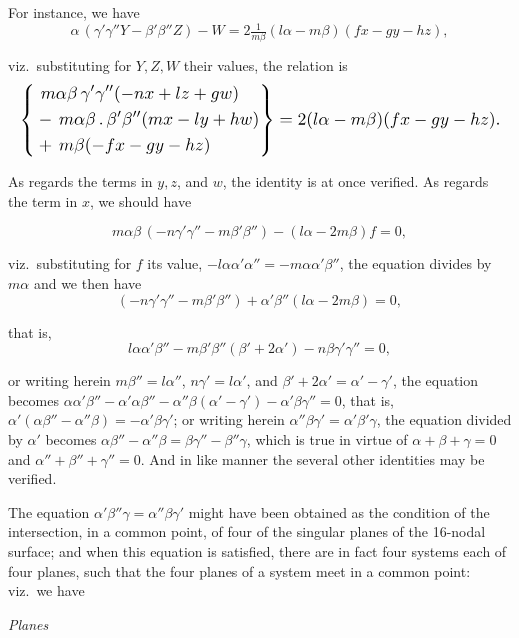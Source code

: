 \documentclass[11pt]{article}
\begin{document}
For instance, we have
\[
\alpha\,(\gamma'\gamma'' Y - \beta'\beta'' Z) - W = 2\tfrac{1}{m\beta}(l\alpha - m\beta)(fx - gy - hz),
\]

viz.\ substituting for $Y, Z, W$ their values, the relation is
\[
\resizebox{\textwidth}{!}{$\displaystyle
\left\{
\begin{aligned}
&\ m\alpha\beta\,\gamma'\gamma''(-nx + lz + gw) \\
&-\,m\alpha\beta\,.\,\beta'\beta''(mx - ly + hw) \\
&+\,m\beta(-fx - gy - hz)
\end{aligned}
\right\} = 2(l\alpha - m\beta)(fx - gy - hz).
$}
\]

As regards the terms in $y, z$, and $w$, the identity is at once verified. As regards the term in $x$, we should have

\[
m\alpha\beta\,(-n\gamma'\gamma'' - m\beta'\beta'') - (l\alpha - 2m\beta)f = 0,
\]

viz.\ substituting for $f$ its value, $-l\alpha\alpha'\alpha'' = -m\alpha\alpha'\beta''$, the equation divides by $m\alpha$ and we then have
\[
(-n\gamma'\gamma'' - m\beta'\beta'') + \alpha'\beta''(l\alpha - 2m\beta) = 0,
\]

that is,
\[
l\alpha\alpha'\beta'' - m\beta'\beta''(\beta' + 2\alpha') - n\beta\gamma'\gamma'' = 0,
\]

or writing herein $m\beta'' = l\alpha''$, $n\gamma' = l\alpha'$, and $\beta' + 2\alpha' = \alpha' - \gamma'$, the equation becomes $\alpha\alpha'\beta'' - \alpha'\alpha\beta'' - \alpha''\beta(\alpha' - \gamma') - \alpha'\beta\gamma'' = 0$, that is, $\alpha'(\alpha\beta'' - \alpha''\beta) = -\alpha'\beta\gamma'$; or writing herein $\alpha''\beta\gamma' = \alpha'\beta'\gamma$, the equation divided by $\alpha'$ becomes $\alpha\beta'' - \alpha''\beta = \beta\gamma'' - \beta''\gamma$, which is true in virtue of $\alpha + \beta + \gamma = 0$ and $\alpha'' + \beta'' + \gamma'' = 0$. And in like manner the several other identities may be verified.

\medskip

The equation $\alpha'\beta''\gamma = \alpha''\beta\gamma'$ might have been obtained as the condition of the intersection, in a common point, of four of the singular planes of the 16-nodal surface; and when this equation is satisfied, there are in fact four systems each of four planes, such that the four planes of a system meet in a common point: viz.\ we have

\medskip
\hfill\textit{Planes}
\end{document}

